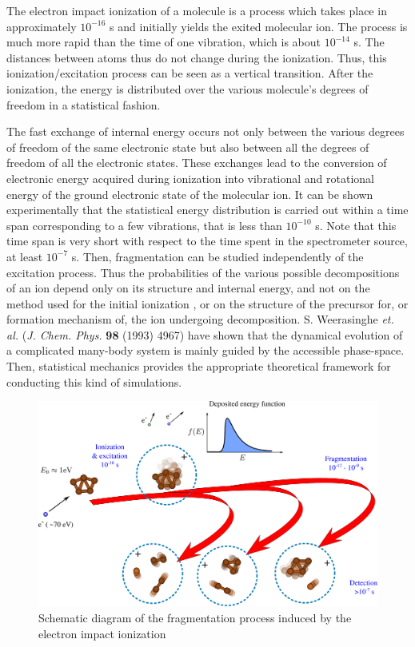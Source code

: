 \documentclass[a4paper,12pt]{article}
\begin{document}
The electron impact ionization of a molecule is a process which takes place in
approximately $10^{-16}$ s and initially yields the exited molecular ion.
The process is much more rapid than the time of one vibration, which is about $10^{-14}$ s. The distances between atoms thus do not change during the
ionization. Thus, this ionization/excitation process can be seen as a vertical transition.
After the ionization, the energy is distributed over the various molecule's degrees of freedom
in a statistical fashion.

The fast exchange of internal energy occurs not only between
the various degrees of freedom of the same electronic state but also between all the degrees
of freedom of all the electronic states. These exchanges lead to the conversion of
electronic energy acquired during ionization into vibrational and rotational energy of the
ground electronic state of the molecular ion.  It can be shown experimentally that the statistical
energy distribution is carried
out within a time span corresponding to a few vibrations, that is less than $10^{-10}$ s. Note that
this time span is very short with respect to the time spent in the spectrometer source, at
least $10^{-7}$ s. Then, fragmentation can be studied independently of the excitation process.
Thus the probabilities of the various possible decompositions
of an ion depend only on its structure and internal energy, and not on the method used for the initial ionization , or 
on the structure of the precursor for, or formation mechanism of, the ion undergoing decomposition.
S. Weerasinghe \textit{et. al.} (\textit{J. Chem. Phys.} \textbf{98} (1993) 4967)
have shown that the dynamical evolution of a complicated many-body system is mainly guided by
the accessible phase-space. Then, statistical mechanics provides the appropriate theoretical framework for
conducting this kind of simulations.

\begin{figure}[h]
\centering
\includegraphics[scale=0.18]{images/fragmentationScheme.eps}
\caption{\footnotesize{
Schematic diagram of the fragmentation process induced by the electron impact ionization
}}
\end{figure}
\end{document}
